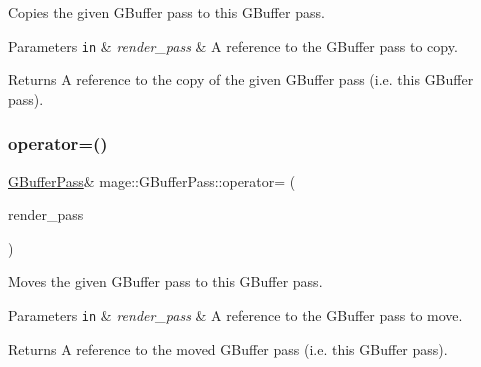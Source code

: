 Copies the given G\+Buffer pass to this G\+Buffer pass.


\begin{DoxyParams}[1]{Parameters}
\mbox{\tt in}  & {\em render\+\_\+pass} & A reference to the G\+Buffer pass to copy. \\
\hline
\end{DoxyParams}
\begin{DoxyReturn}{Returns}
A reference to the copy of the given G\+Buffer pass (i.\+e. this G\+Buffer pass). 
\end{DoxyReturn}
\hypertarget{classmage_1_1_g_buffer_pass_ace14aafdd028f12296b3fabf1e36ca02}{}\label{classmage_1_1_g_buffer_pass_ace14aafdd028f12296b3fabf1e36ca02} 
\subsubsection{\texorpdfstring{operator=()}{operator=()}\hspace{0.1cm}{\footnotesize\ttfamily [2/2]}}
{\footnotesize\ttfamily \hyperlink{classmage_1_1_g_buffer_pass}{G\+Buffer\+Pass}\& mage\+::\+G\+Buffer\+Pass\+::operator= (\begin{DoxyParamCaption}\item[{\hyperlink{classmage_1_1_g_buffer_pass}{G\+Buffer\+Pass} \&\&}]{render\+\_\+pass }\end{DoxyParamCaption})\hspace{0.3cm}{\ttfamily [delete]}}

Moves the given G\+Buffer pass to this G\+Buffer pass.


\begin{DoxyParams}[1]{Parameters}
\mbox{\tt in}  & {\em render\+\_\+pass} & A reference to the G\+Buffer pass to move. \\
\hline
\end{DoxyParams}
\begin{DoxyReturn}{Returns}
A reference to the moved G\+Buffer pass (i.\+e. this G\+Buffer pass). 
\end{DoxyReturn}
\hypertarget{classmage_1_1_g_buffer_pass_abd4c5154aefd3d8e9befdb572b37f40d}{}\label{classmage_1_1_g_buffer_pass_abd4c5154aefd3d8e9befdb572b37f40d} 
